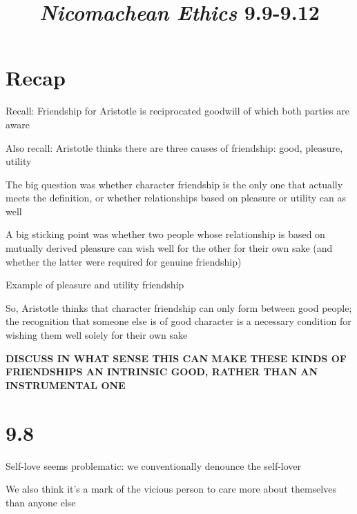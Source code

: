 \documentclass[11pt]{article}
\title{\emph{Nicomachean Ethics} 9.9-9.12}
\author{}
\date{}
\begin{document}
\maketitle

\section{Recap}

\noindent Recall: Friendship for Aristotle is reciprocated goodwill of which both parties are aware
\vspace*{2mm}

\noindent Also recall: Aristotle thinks there are three causes of friendship: good, pleasure, utility
\vspace*{2mm}

\noindent The big question was whether character friendship is the only one that actually meets the definition, or whether relationships based on pleasure or utility can as well
\vspace*{2mm}

\noindent A big sticking point was whether two people whose relationship is based on mutually derived pleasure can wish well for the other for their own sake (and whether the latter were required for genuine friendship)
\vspace*{2mm}

\noindent Example of pleasure and utility friendship
\vspace*{2mm}

\noindent So, Aristotle thinks that character friendship can only form between good people; the recognition that someone else is of good character is a necessary condition for wishing them well solely for their own sake
\vspace*{2mm}

\noindent\textbf{DISCUSS IN WHAT SENSE THIS CAN MAKE THESE KINDS OF FRIENDSHIPS AN INTRINSIC GOOD, RATHER THAN AN INSTRUMENTAL ONE}

\section{9.8}

\noindent Self-love seems problematic: we conventionally denounce the self-lover
\vspace*{2mm}

\noindent We also think it's a mark of the vicious person to care more about themselves than anyone else
\vspace*{2mm}
\end{document}
